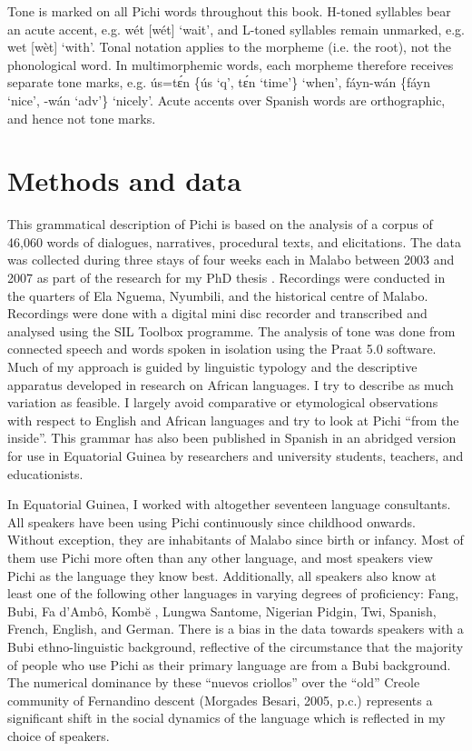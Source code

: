 Tone is marked on all Pichi words throughout this book. H-toned syllables bear an acute accent, e.g. wét [wét] ‘wait’, and L-toned syllables remain unmarked, e.g. wet [wèt] ‘with’. Tonal notation applies to the morpheme (i.e. the root), not the phonological word. In multimorphemic words, each morpheme therefore receives separate tone marks, e.g. ús=tɛ́n \{ús ‘q’, tɛ́n ‘time’\} ‘when’, fáyn-wán \{fáyn ‘nice’, -wán ‘adv’\} ‘nicely’. Acute accents over Spanish words are orthographic, and hence not tone marks.


\section{Methods and data}\label{sec:1.7}

This grammatical description of Pichi is based on the analysis of a corpus of 46,060 words of dialogues, narratives, procedural texts, and elicitations. The data was collected during three stays of four weeks each in Malabo between 2003 and 2007 as part of the research for my PhD thesis \citep{Yakpo2009a}. Recordings were conducted in the quarters of Ela Nguema, Nyumbili, and the historical centre of Malabo. Recordings were done with a digital mini disc recorder and transcribed and analysed using the SIL Toolbox  programme. The analysis of tone was done from connected speech and words spoken in isolation using the Praat 5.0 software. Much of my approach is guided by linguistic typology and the descriptive apparatus developed in research on African languages. I try to describe as much variation as feasible. I largely avoid comparative or etymological observations with respect to English and African languages and try to look at Pichi “from the inside”. This grammar has also been published in Spanish \citep{Yakpo2010} in an abridged version for use in Equatorial Guinea by researchers and university students, teachers, and educationists. 


In Equatorial Guinea, I worked with altogether seventeen language consultants. All speakers have been using Pichi continuously since childhood onwards. Without exception, they are inhabitants of Malabo since birth or infancy. Most of them use Pichi more often than any other language, and most speakers view Pichi as the language they know best. Additionally, all speakers also know at least one of the following other languages in varying degrees of proficiency: Fang, Bubi, Fa d’Ambô, Kombe\u{} , Lungwa Santome, Nigerian Pidgin, Twi, Spanish, French, English, and German. There is a bias in the data towards speakers with a Bubi ethno-linguistic background, reflective of the circumstance that the majority of people who use Pichi as their primary language are from a Bubi background. The numerical dominance by these “nuevos criollos” over the “old” Creole community of Fernandino descent (Morgades Besari, 2005, p.c.) represents a significant shift in the social dynamics of the language which is reflected in my choice of speakers. 



